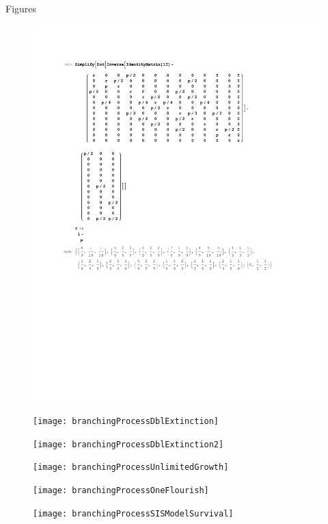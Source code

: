 \documentclass[12pt]{article}
\numberwithin{equation}{section}
\begin{document}
\begin{section}{Figures}
\begin{figure}
\centering
\includegraphics{Assignment3MathematicaPrintout}
\end{figure}
\begin{figure}
  \centering
  \texttt{[image: branchingProcessDblExtinction]}
\end{figure}
\begin{figure}
    \centering
    \texttt{[image: branchingProcessDblExtinction2]}
\end{figure}
\begin{figure}
    \centering
    \texttt{[image: branchingProcessUnlimitedGrowth]}
\end{figure}
\begin{figure}
\centering
\texttt{[image: branchingProcessOneFlourish]}
\end{figure}
\begin{figure}
\centering
\texttt{[image: branchingProcessSISModelSurvival]}
\end{figure}

\end{section}
\end{document}
